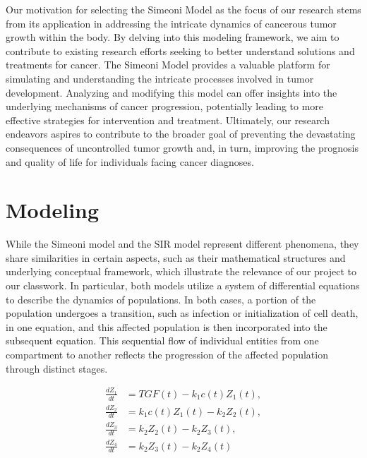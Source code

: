 \documentclass[11pt,reqno]{amsart}
\begin{document}
Our motivation for selecting the Simeoni Model as the focus of our research stems from its application in addressing the intricate dynamics of cancerous tumor growth within the body. By delving into this modeling framework, we aim to contribute to existing research efforts seeking to better understand solutions and treatments for cancer. The Simeoni Model provides a valuable platform for simulating and understanding the intricate processes involved in tumor development. Analyzing and modifying this model can offer insights into the underlying mechanisms of cancer progression, potentially leading to more effective strategies for intervention and treatment. Ultimately, our research endeavors aspires to contribute to the broader goal of preventing the devastating consequences of uncontrolled tumor growth and, in turn, improving the prognosis and quality of life for individuals facing cancer diagnoses.


\section{Modeling}
While the Simeoni model and the SIR model represent different phenomena, they share similarities in certain aspects, such as their mathematical structures and underlying conceptual framework, which illustrate the relevance of our project to our classwork. In particular, both models utilize a system of differential equations to describe the dynamics of populations. In both cases, a portion of the population undergoes a transition, such as infection or initialization of cell death, in one equation, and this affected population is then incorporated into the subsequent equation. This sequential flow of individual entities from one compartment to another reflects the progression of the affected population through distinct stages.

\begin{equation}\label{eq:1.1}
\begin{aligned}
    \frac{dZ_1}{dt} &= TGF(t) - k_1c(t)Z_1(t), \\
    \frac{dZ_2}{dt} &= k_1c(t)Z_1(t) - k_2Z_2(t), \\ 
    \frac{dZ_3}{dt} &= k_2Z_2(t) - k_2Z_3(t), \\
    \frac{dZ_4}{dt} &= k_2Z_3(t) - k_2Z_4(t)
\end{aligned}
\tag*{(1.1)}
\end{equation}
\hspace{2em}

\hspace{2em}
\end{document}
